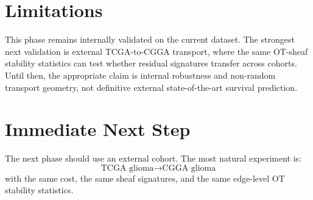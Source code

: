 \documentclass[11pt]{article}
\begin{document}
\section{Limitations}
This phase remains internally validated on the current dataset.  The strongest next validation is external TCGA-to-CGGA transport, where the same OT-sheaf stability statistics can test whether residual signatures transfer across cohorts.  Until then, the appropriate claim is internal robustness and non-random transport geometry, not definitive external state-of-the-art survival prediction.

\section{Immediate Next Step}
The next phase should use an external cohort.  The most natural experiment is:
\begin{equation}
\text{TCGA glioma}\longrightarrow \text{CGGA glioma}
\end{equation}
with the same cost, the same sheaf signatures, and the same edge-level OT stability statistics.
\end{document}
